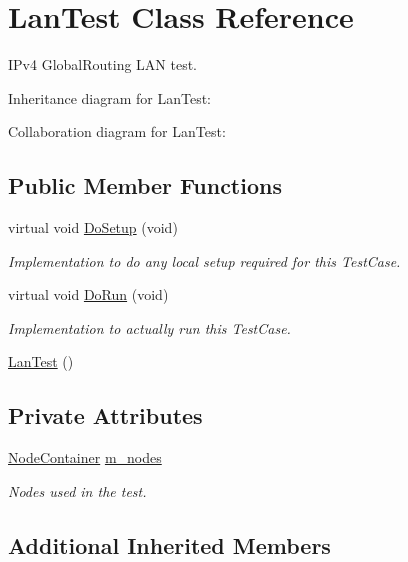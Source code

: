 \hypertarget{classLanTest}{}\section{Lan\+Test Class Reference}
\label{classLanTest}


I\+Pv4 Global\+Routing L\+AN test.  




Inheritance diagram for Lan\+Test\+:


Collaboration diagram for Lan\+Test\+:
\subsection*{Public Member Functions}
\begin{DoxyCompactItemize}
\item 
virtual void \hyperlink{classLanTest_a1e5e94be4456c27e8aca1cc16a3491f2}{Do\+Setup} (void)
\begin{DoxyCompactList}\small\item\em Implementation to do any local setup required for this Test\+Case. \end{DoxyCompactList}\item 
virtual void \hyperlink{classLanTest_a559d2aaff52c1d25c0ec95ac5688d331}{Do\+Run} (void)
\begin{DoxyCompactList}\small\item\em Implementation to actually run this Test\+Case. \end{DoxyCompactList}\item 
\hyperlink{classLanTest_a6d4665a686fa7e51d398deb0ead2cd3d}{Lan\+Test} ()
\end{DoxyCompactItemize}
\subsection*{Private Attributes}
\begin{DoxyCompactItemize}
\item 
\hyperlink{classns3_1_1NodeContainer}{Node\+Container} \hyperlink{classLanTest_aa89c8886b5180249409317603fe09577}{m\+\_\+nodes}
\begin{DoxyCompactList}\small\item\em Nodes used in the test. \end{DoxyCompactList}\end{DoxyCompactItemize}
\subsection*{Additional Inherited Members}



